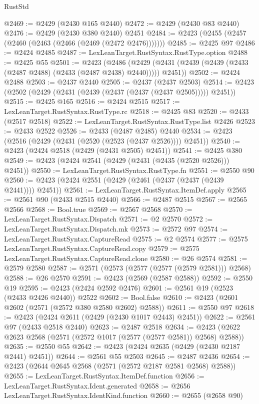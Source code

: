 \begin{lexlean}{RustStd}
\begin{coremodule}
@2469 := @2429 (@2430 @165 @2440)
@2472 := @2429 (@2430 @83 @2440)
@2476 := @2429 (@2430 @380 @2440) @2451
@2484 := @2423 (@2455 (@2457 (@2460 (@2463 (@2466 (@2469 (@2472 @2476)))))))
@2485 := @2425 @97
@2486 := @2424 @2485
@2487 := LexLeanTarget.RustSyntax.RustType.option
@2488 := @2425 @55
@2501 := @2423
    (@2486 (@2429 (@2431 (@2439 (@2439 (@2433 (@2487 @2488) (@2433 (@2487 @2438) @2440))))) @2451))
@2502 := @2424 @2488
@2503 := @2437 @2440
@2505 := @2437 (@2437 @2503)
@2514 := @2423 (@2502 (@2429 (@2431 (@2439 (@2437 (@2437 (@2437 @2505))))) @2451))
@2515 := @2425 @165
@2516 := @2424 @2515
@2517 := LexLeanTarget.RustSyntax.RustType.rc
@2518 := @2425 @83
@2520 := @2433 (@2517 @2518)
@2522 := LexLeanTarget.RustSyntax.RustType.list @2426
@2523 := @2433 @2522
@2526 := @2433 (@2487 @2485) @2440
@2534 := @2423 (@2516 (@2429 (@2431 (@2520 (@2523 (@2437 @2526)))) @2451))
@2540 := @2423 (@2424 @2518 (@2429 (@2431 @2505) @2451))
@2541 := @2425 @380
@2549 := @2423 (@2424 @2541 (@2429 (@2431 (@2435 (@2520 @2526))) @2451))
@2550 := LexLeanTarget.RustSyntax.RustType.fn
@2551 := @2550 @90
@2560 := @2423 (@2424 @2551 (@2429 (@2461 (@2437 (@2437 (@2439 @2441)))) @2451))
@2561 := LexLeanTarget.RustSyntax.ItemDef.apply
@2565 := @2561 @90 (@2433 @2515 @2440)
@2566 := @2487 @2515
@2567 := @2565 @2566
@2568 := Bool.true
@2569 := @2567 @2568
@2570 := LexLeanTarget.RustSyntax.Dispatch
@2571 := @2 @2570
@2572 := LexLeanTarget.RustSyntax.Dispatch.mk
@2573 := @2572 @97
@2574 := LexLeanTarget.RustSyntax.CaptureRead
@2575 := @2 @2574
@2577 := @2575 LexLeanTarget.RustSyntax.CaptureRead.copy
@2579 := @2575 LexLeanTarget.RustSyntax.CaptureRead.clone
@2580 := @26 @2574
@2581 := @2579 @2580
@2587 := @2571 (@2573 (@2577 (@2577 (@2579 @2581))) @2568)
@2588 := @26 @2570
@2591 := @2423 (@2569 (@2587 @2588))
@2592 := @2550 @19
@2595 := @2423 (@2424 @2592 @2476)
@2601 := @2561 @19 (@2523 (@2433 @2426 @2440)) @2522
@2602 := Bool.false
@2610 := @2423 (@2601 @2602 (@2571 (@2572 @380 @2580 @2602) @2588))
@2611 := @2550 @97
@2618 := @2423 (@2424 @2611 (@2429 (@2430 @1017 @2443) @2451))
@2622 := @2561 @97 (@2433 @2518 @2440)
@2623 := @2487 @2518
@2634 := @2423 (@2622 @2623 @2568 (@2571 (@2572 @1017 (@2577 (@2577 @2581)) @2568) @2588))
@2635 := @2550 @55
@2642 := @2423 (@2424 @2635 (@2429 (@2430 @2187 @2441) @2451))
@2644 := @2561 @55 @2503
@2645 := @2487 @2436
@2654 := @2423 (@2644 @2645 @2568 (@2571 (@2572 @2187 @2581 @2568) @2588))
@2655 := LexLeanTarget.RustSyntax.ItemDef.function
@2656 := LexLeanTarget.RustSyntax.Ident.generated
@2658 := @2656 LexLeanTarget.RustSyntax.IdentKind.function
@2660 := @2655 (@2658 @90)

\end{coremodule}
\end{lexlean}

